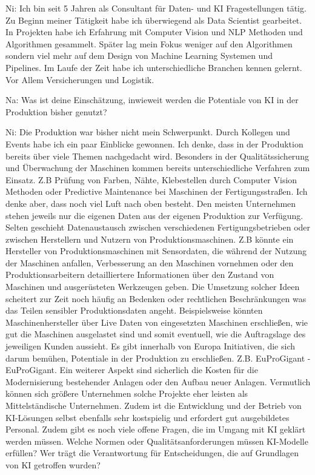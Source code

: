 \documentclass[a4paper,12pt, german]{report}
\begin{document}
Ni: Ich bin seit 5 Jahren als Consultant für Daten- und KI Fragestellungen tätig. Zu Beginn meiner Tätigkeit habe ich überwiegend als Data Scientist gearbeitet. In Projekten habe ich Erfahrung mit Computer Vision und NLP Methoden und Algorithmen gesammelt. Später lag mein Fokus weniger auf den Algorithmen sondern viel mehr auf dem Design von Machine Learning Systemen und Pipelines. Im Laufe der Zeit habe ich unterschiedliche Branchen kennen gelernt. Vor Allem Versicherungen und Logistik.

Na: Was ist deine Einschätzung, inwieweit werden die Potentiale von KI in der Produktion bisher genutzt?

Ni: Die Produktion war bisher nicht mein Schwerpunkt. Durch Kollegen und Events habe ich ein paar Einblicke gewonnen.
Ich denke, dass in der Produktion bereits über viele Themen nachgedacht wird. Besonders in der Qualitätssicherung und Überwachung der Maschinen kommen bereits unterschiedliche Verfahren zum Einsatz. Z.B Prüfung von Farben, Nähte, Klebestellen durch Computer Vision Methoden oder Predictive Maintenance bei Maschinen der Fertigungsstraßen.\newline
Ich denke aber, dass noch viel Luft nach oben besteht. Den meisten Unternehmen stehen jeweils nur die eigenen Daten aus der eigenen Produktion zur Verfügung. Selten geschieht Datenaustausch zwischen verschiedenen Fertigungsbetrieben oder zwischen Herstellern und Nutzern von Produktionsmaschinen. Z.B könnte ein Hersteller von Produktionsmaschinen mit Sensordaten, die während der Nutzung der Maschinen anfallen, Verbesserung an den Maschinen vornehmen oder den Produktionsarbeitern detailliertere Informationen über den Zustand von Maschinen und ausgerüsteten Werkzeugen geben.
Die Umsetzung solcher Ideen scheitert zur Zeit noch häufig an Bedenken oder rechtlichen Beschränkungen was das Teilen sensibler Produktionsdaten angeht. Beispielsweise könnten Maschinenhersteller über Live Daten von eingesetzten Maschinen erschließen, wie gut die Maschinen ausgelastet sind und somit eventuell, wie die Auftragslage des jeweiligen Kunden aussieht.\newline
Es gibt innerhalb von Europa Initiativen, die sich darum bemühen, Potentiale in der Produktion zu erschließen. Z.B. EuProGigant - EuProGigant.
Ein weiterer Aspekt sind sicherlich die Kosten für die Modernisierung bestehender Anlagen oder den Aufbau neuer Anlagen. Vermutlich können sich größere Unternehmen solche Projekte eher leisten als Mittelständische Unternehmen. Zudem ist die Entwicklung und der Betrieb von KI-Lösungen selbst ebenfalls sehr kostspielig und erfordert gut ausgebildetes Personal. Zudem gibt es noch viele offene Fragen, die im Umgang mit KI geklärt werden müssen. Welche Normen oder Qualitätsanforderungen müssen KI-Modelle erfüllen? Wer trägt die Verantwortung für Entscheidungen, die auf Grundlagen von KI getroffen wurden? 
\end{document}
